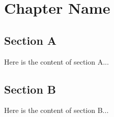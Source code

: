 \chapter{Chapter Name}

\section{Section A}

Here is the content of section A...

\section{Section B}

Here is the content of section B...

